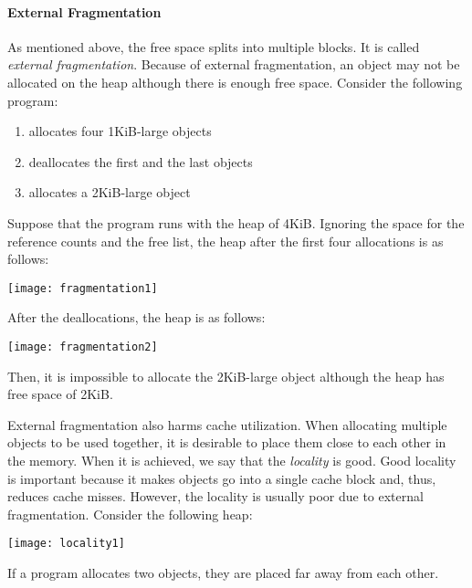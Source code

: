 \paragraph{External Fragmentation}

As mentioned above, the free space splits into multiple blocks. It is called
\textit{external fragmentation}.  Because of
external fragmentation, an object may not be allocated on the heap although there is
enough free space. Consider the following program:

\begin{enumerate}
  \item allocates four 1KiB-large objects
  \item deallocates the first and the last objects
  \item allocates a 2KiB-large object
\end{enumerate}

Suppose that the program runs with the heap of 4KiB. Ignoring the space for
the reference counts and the free list, the heap after the first four
allocations is as follows:

\begin{center}
\texttt{[image: fragmentation1]}
\end{center}

After the deallocations, the heap is as follows:

\begin{center}
\texttt{[image: fragmentation2]}
\end{center}

Then, it is impossible to allocate the 2KiB-large object although the heap has
free space of 2KiB.

External fragmentation also harms cache utilization. When allocating multiple
objects to be used together, it is desirable to place them close to each other
in the memory.  When it is achieved, we say that the
\textit{locality} is good.  Good locality is important because
it makes objects go into a single cache block and, thus, reduces cache misses.
However, the locality is usually poor due to external fragmentation. Consider
the following heap:

\begin{center}
\texttt{[image: locality1]}
\end{center}

If a program allocates two objects, they are placed far away from each other.

